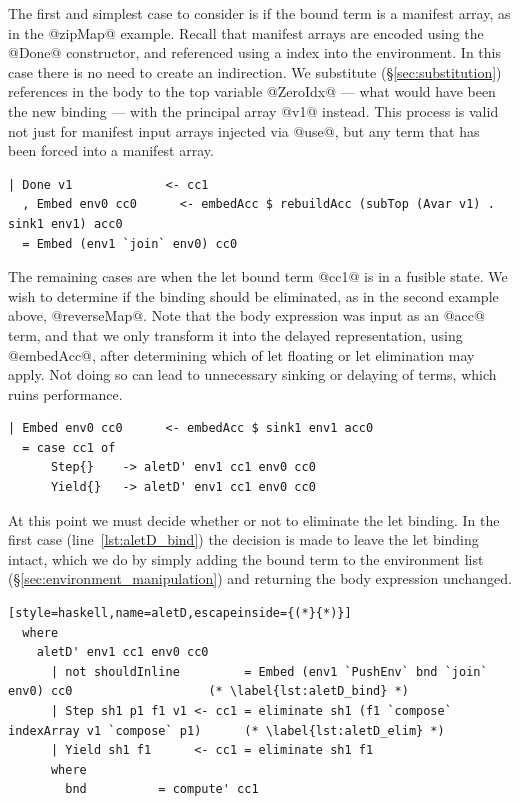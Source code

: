 The first and simplest case to consider is if the bound term is a manifest
array, as in the @zipMap@ example. Recall that manifest arrays are encoded
using the @Done@ constructor, and referenced using a 
index into the environment. In this case there is no need to create an
indirection. We substitute (\S\ref{sec:substitution}) references in the body to
the top variable @ZeroIdx@ --- what would have been the new binding ---
with the principal array @v1@ instead. This process is valid not just for
manifest input arrays injected via @use@, but any term that has been forced
into a manifest array.
%
\begin{lstlisting}[style=haskell,name=aletD]
  | Done v1             <- cc1
  , Embed env0 cc0      <- embedAcc $ rebuildAcc (subTop (Avar v1) . sink1 env1) acc0
  = Embed (env1 `join` env0) cc0
\end{lstlisting}

The remaining cases are when the let bound term @cc1@ is in a fusible
state. We wish to determine if the binding should be eliminated, as in the
second example above, @reverseMap@. Note that the body expression was input
as an @acc@ term, and that we only transform it into the delayed
representation, using @embedAcc@, after determining which of let floating
or let elimination may apply. Not doing so can lead to unnecessary sinking or
delaying of terms, which ruins performance.
%
\begin{lstlisting}[style=haskell,name=aletD]
  | Embed env0 cc0      <- embedAcc $ sink1 env1 acc0
  = case cc1 of
      Step{}    -> aletD' env1 cc1 env0 cc0
      Yield{}   -> aletD' env1 cc1 env0 cc0
\end{lstlisting}

At this point we must decide whether or not to eliminate the let binding. In the
first case (line~\ref{lst:aletD_bind}) the decision is made to leave the let
binding intact, which we do by simply adding the bound term to the environment
list (\S\ref{sec:environment_manipulation}) and returning the body expression
unchanged.
%
\begin{lstlisting}[style=haskell,name=aletD,escapeinside={(*}{*)}]
  where
    aletD' env1 cc1 env0 cc0
      | not shouldInline         = Embed (env1 `PushEnv` bnd `join` env0) cc0                   (* \label{lst:aletD_bind} *)
      | Step sh1 p1 f1 v1 <- cc1 = eliminate sh1 (f1 `compose` indexArray v1 `compose` p1)      (* \label{lst:aletD_elim} *)
      | Yield sh1 f1      <- cc1 = eliminate sh1 f1
      where
        bnd          = compute' cc1
\end{lstlisting}

